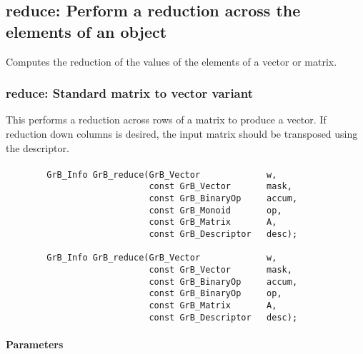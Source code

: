 
\subsection{{\sf reduce}: Perform a reduction across the elements of an object}

Computes the reduction of the values of the elements of a vector or matrix.


\subsubsection{{\sf reduce}: Standard matrix to vector variant}

This performs a reduction across rows of a matrix to produce a vector.  If 
reduction down columns is desired, the input matrix should be transposed 
using the descriptor.

\paragraph{\syntax}

\begin{verbatim}
        GrB_Info GrB_reduce(GrB_Vector             w,
                            const GrB_Vector       mask,
                            const GrB_BinaryOp     accum,
                            const GrB_Monoid       op,  
                            const GrB_Matrix       A,
                            const GrB_Descriptor   desc);
                            
        GrB_Info GrB_reduce(GrB_Vector             w,
                            const GrB_Vector       mask,
                            const GrB_BinaryOp     accum,
                            const GrB_BinaryOp     op,  
                            const GrB_Matrix       A,
                            const GrB_Descriptor   desc);
\end{verbatim}

\paragraph{Parameters}

